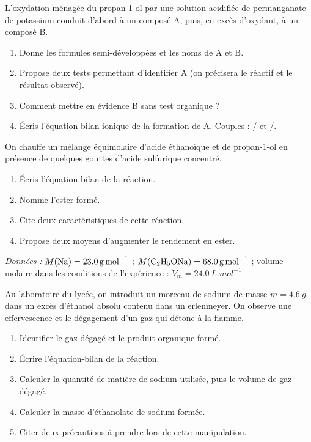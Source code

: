 \documentclass[11pt]{article}
\newcounter{popsec}
\newcounter{popsub}
\newcommand{\courssub}[1]{%
  \stepcounter{popsub}%
  \par\vspace{9pt}\noindent{\popxbold\fontsize{11.5}{13}\selectfont\color{popink}{\color{poporange}\thepopsec.\thepopsub}\hspace{6pt}#1}\par\nopagebreak\vspace{4pt}
}
\begin{document}
\begin{exercice}
L'oxydation ménagée du propan-1-ol par une solution acidifiée de permanganate de potassium conduit d'abord à un composé A, puis, en excès d'oxydant, à un composé B.
\begin{enumerate}
  \item Donne les formules semi-développées et les noms de A et B.
  \item Propose deux tests permettant d'identifier A (on précisera le réactif et le résultat observé).
  \item Comment mettre en évidence B sans test organique ?
  \item Écris l'équation-bilan ionique de la formation de A. Couples : / et /.
\end{enumerate}
\end{exercice}

\begin{exercice}[Estérification]
On chauffe un mélange équimolaire d'acide éthanoïque et de propan-1-ol en présence de quelques gouttes d'acide sulfurique concentré.
\begin{enumerate}
  \item Écris l'équation-bilan de la réaction.
  \item Nomme l'ester formé.
  \item Cite deux caractéristiques de cette réaction.
  \item Propose deux moyens d'augmenter le rendement en ester.
\end{enumerate}
\end{exercice}

\courssub{Je me prépare au Bac}

\begin{exercice}
\emph{Données :} $M(\ce{Na}) = \SI{23,0}{g.mol^{-1}}$ ; $M(\ce{C2H5ONa}) = \SI{68,0}{g.mol^{-1}}$ ; volume molaire dans les conditions de l'expérience : $V_m = \SI{24,0}{L.mol^{-1}}$.

Au laboratoire du lycée, on introduit un morceau de sodium de masse $m = \SI{4,6}{g}$ dans un excès d'éthanol absolu contenu dans un erlenmeyer. On observe une effervescence et le dégagement d'un gaz qui détone à la flamme.
\begin{enumerate}
  \item Identifier le gaz dégagé et le produit organique formé.
  \item Écrire l'équation-bilan de la réaction.
  \item Calculer la quantité de matière de sodium utilisée, puis le volume de gaz dégagé.
  \item Calculer la masse d'éthanolate de sodium formée.
  \item Citer deux précautions à prendre lors de cette manipulation.
\end{enumerate}
\end{exercice}
\end{document}
